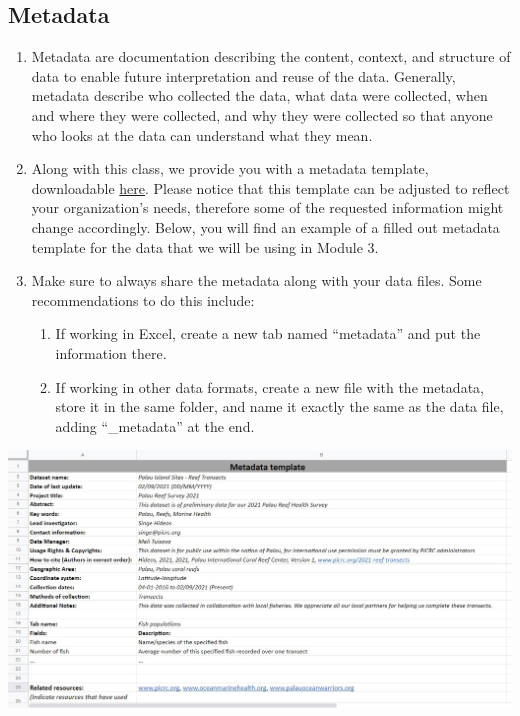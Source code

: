 \documentclass[
]{book}
\providecommand{\tightlist}{%
  \setlength{\itemsep}{0pt}\setlength{\parskip}{0pt}}
\begin{document}
\hypertarget{metadata}{%
\subsection{Metadata}\label{metadata}}

\begin{enumerate}
\def\labelenumi{\arabic{enumi}.}
\item
  Metadata are documentation describing the content, context, and structure of data to enable future interpretation and reuse of the data. Generally, metadata describe who collected the data, what data were collected, when and where they were collected, and why they were collected so that anyone who looks at the data can understand what they mean.
\item
  Along with this class, we provide you with a metadata template, downloadable \href{files/metadata_template_blank.xlsx}{here}. Please notice that this template can be adjusted to reflect your organization's needs, therefore some of the requested information might change accordingly. Below, you will find an example of a filled out metadata template for the data that we will be using in Module 3.
\item
  Make sure to always share the metadata along with your data files. Some recommendations to do this include:

  \begin{enumerate}
  \def\labelenumii{\arabic{enumii}.}
  \tightlist
  \item
    If working in Excel, create a new tab named ``metadata'' and put the information there.
  \item
    If working in other data formats, create a new file with the metadata, store it in the same folder, and name it exactly the same as the data file, adding ``\_metadata'' at the end.
  \end{enumerate}
\end{enumerate}

\includegraphics{images/m2s1_metadata_template_filled.jpg}
\end{document}
